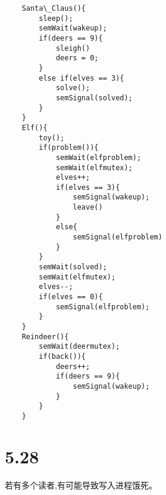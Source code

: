 \documentclass[UTF8]{ctexart}
\begin{document}
    \begin{lstlisting}
    Santa\_Claus(){
        sleep();
        semWait(wakeup);
        if(deers == 9){
            sleigh()
            deers = 0;
        }
        else if(elves == 3){
            solve();
            semSignal(solved);
        }
    }
    Elf(){
        toy();
        if(problem()){
            semWait(elfproblem);
            semWait(elfmutex);
            elves++;
            if(elves == 3){
                semSignal(wakeup);
                leave()
            }
            else{
                semSignal(elfproblem)
            }
        }
        semWait(solved);
        semWait(elfmutex);
        elves--;
        if(elves == 0){
            semSignal(elfproblem);
        }
    }
    Reindeer(){
        semWait(deermutex);
        if(back()){
            deers++;
            if(deers == 9){
                semSignal(wakeup);
            }
        }
    }
    \end{lstlisting}
    \section{5.28}
    若有多个读者,有可能导致写入进程饿死。
\end{document}
